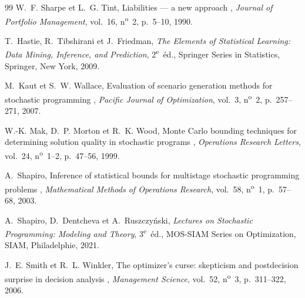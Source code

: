 \documentclass[11pt,letterpaper]{article}
\theoremstyle{definition}
\begin{document}
\begin{thebibliography}{99}
W.~F. Sharpe et L.~G. Tint,
\og Liabilities --- a new approach \fg,
\emph{Journal of Portfolio Management}, vol.~16, n\textsuperscript{o}~2,
p.~5--10, 1990.


T.~Hastie, R.~Tibshirani et J.~Friedman,
\emph{The Elements of Statistical Learning: Data Mining, Inference, and
Prediction}, 2\textsuperscript{e}~éd., Springer Series in Statistics, Springer,
New York, 2009.

M.~Kaut et S.~W. Wallace,
\og Evaluation of scenario generation methods for stochastic programming \fg,
\emph{Pacific Journal of Optimization}, vol.~3, n\textsuperscript{o}~2,
p.~257--271, 2007.

W.-K. Mak, D.~P. Morton et R.~K. Wood,
\og Monte Carlo bounding techniques for determining solution quality in
stochastic programs \fg,
\emph{Operations Research Letters}, vol.~24, n\textsuperscript{o}~1--2,
p.~47--56, 1999.

A.~Shapiro,
\og Inference of statistical bounds for multistage stochastic programming
problems \fg,
\emph{Mathematical Methods of Operations Research}, vol.~58,
n\textsuperscript{o}~1, p.~57--68, 2003.

A.~Shapiro, D.~Dentcheva et A.~Ruszczyński,
\emph{Lectures on Stochastic Programming: Modeling and Theory},
3\textsuperscript{e}~éd., MOS-SIAM Series on Optimization, SIAM,
Philadelphie, 2021.

J.~E. Smith et R.~L. Winkler,
\og The optimizer's curse: skepticism and postdecision surprise in decision
analysis \fg,
\emph{Management Science}, vol.~52, n\textsuperscript{o}~3, p.~311--322, 2006.

\end{thebibliography}
\end{document}

